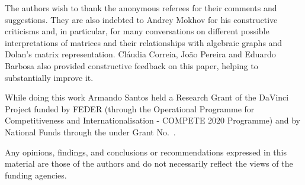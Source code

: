 \documentclass[sigplan,screen]{acmart}\settopmatter{}
\begin{document}
\begin{acks} %

The authors wish to thank the anonymous referees for their comments and suggestions. They are also indebted to Andrey Mokhov for his constructive criticisms and, in particular, for many conversations on different possible interpretations of matrices and their relationships with algebraic graphs and Dolan's matrix representation.
Cláudia Correia, João Pereira and Eduardo Barbosa also provided constructive feedback on this paper, helping to substantially improve it. %

While doing this work Armando Santos held a Research Grant of the DaVinci Project funded by FEDER (through the Operational Programme for Competitiveness and Internationalisation - COMPETE 2020 Programme) and by National Funds through the
under Grant No.~.

Any opinions, findings, and conclusions or recommendations expressed in this material are those of the authors and do not necessarily reflect the views of the funding agencies.
\end{acks}



\end{document}

